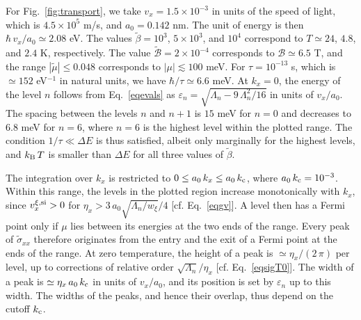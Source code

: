 \documentclass[aps,prb, onecolumn, nofootinbib, citeautoscript,10pt]{revtex4-2}
\newcommand{\red}[1]{{\color{red}#1}}
\begin{document}
\red{For Fig.~\ref{fig:transport}, we take $v_x=1.5\times10^{-3}$ in units of the speed of light, which is $4.5\times10^{5}$ m/s, and $a_0=0.142$ nm. The unit of energy is then $\hbar\,v_x/a_0\simeq2.08$ eV. The values $\tilde\beta=10^{3}$, $5\times10^{3}$, and $10^{4}$ correspond to $T\simeq24$, $4.8$, and $2.4$ K, respectively. The value $\tilde{\mathcal B}=2\times10^{-4}$ corresponds to $\mathcal B\simeq6.5$ T, and the range $|\tilde\mu|\le0.048$ corresponds to $|\mu|\lesssim100$ meV. For $\tau=10^{-13}$ s, which is $\simeq152$ eV$^{-1}$ in natural units, we have $\hbar/\tau\simeq6.6$ meV. At $k_x=0$, the energy of the level $n$ follows from Eq.~\eqref{eqevals} as $\varepsilon_n=\sqrt{\Lambda_n-9\,\Lambda_n^2/16}$ in units of $v_x/a_0$. The spacing between the levels $n$ and $n+1$ is $15$ meV for $n=0$ and decreases to $6.8$ meV for $n=6$, where $n=6$ is the highest level within the plotted range. The condition $1/\tau\ll\Delta E$ is thus satisfied, albeit only marginally for the highest levels, and $k_{\rm B}\,T$ is smaller than $\Delta E$ for all three values of $\tilde\beta$.}

\red{The integration over $k_x$ is restricted to $0\le a_0\,k_x\le a_0\,k_{\rm c}$, where $a_0\,k_{\rm c}=10^{-3}$. Within this range, the levels in the plotted region increase monotonically with $k_x$, since $v^{\xi,{\rm si}}_x>0$ for $\eta_x>3\,a_0\sqrt{\Lambda_n/w_\xi}/4$ [cf. Eq.~\eqref{eqgv}]. A level then has a Fermi point only if $\mu$ lies between its energies at the two ends of the range. Every peak of $\tilde\sigma_{xx}$ therefore originates from the entry and the exit of a Fermi point at the ends of the range. At zero temperature, the height of a peak is $\simeq\eta_x/(2\,\pi)$ per level, up to corrections of relative order $\sqrt{\Lambda_n}/\eta_x$ [cf. Eq.~\eqref{eqsigT0}]. The width of a peak is $\simeq\eta_x\,a_0\,k_{\rm c}$ in units of $v_x/a_0$, and its position is set by $\varepsilon_n$ up to this width. The widths of the peaks, and hence their overlap, thus depend on the cutoff $k_{\rm c}$.}
\end{document}
